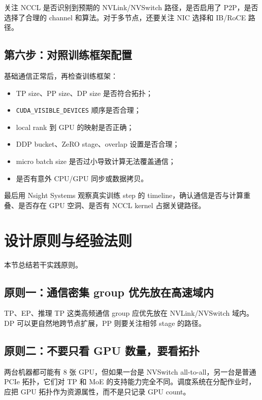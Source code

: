 关注 NCCL 是否识别到预期的 NVLink/NVSwitch 路径，是否启用了 P2P，是否选择了合理的 channel 和算法。对于多节点，还要关注 NIC 选择和 IB/RoCE 路径。

\subsection{第六步：对照训练框架配置}
\label{subsec:debug-step-framework}

基础通信正常后，再检查训练框架：

\begin{itemize}
  \item TP size、PP size、DP size 是否符合拓扑；
  \item \texttt{CUDA\_VISIBLE\_DEVICES} 顺序是否合理；
  \item local rank 到 GPU 的映射是否正确；
  \item DDP bucket、ZeRO stage、overlap 设置是否合理；
  \item micro batch size 是否过小导致计算无法覆盖通信；
  \item 是否有意外 CPU/GPU 同步或数据拷贝。
\end{itemize}

最后用 Nsight Systems 观察真实训练 step 的 timeline，确认通信是否与计算重叠、是否存在 GPU 空洞、是否有 NCCL kernel 占据关键路径。

\section{设计原则与经验法则}
\label{sec:nvlink-design-principles}

本节总结若干实践原则。

\subsection{原则一：通信密集 group 优先放在高速域内}
\label{subsec:principle-fast-domain}

TP、EP、推理 TP 这类高频通信 group 应优先放在 NVLink/NVSwitch 域内。DP 可以更自然地跨节点扩展，PP 则要关注相邻 stage 的路径。

\subsection{原则二：不要只看 GPU 数量，要看拓扑}
\label{subsec:principle-not-just-gpu-count}

两台机器都可能有 8 张 GPU，但如果一台是 NVSwitch all-to-all，另一台是普通 PCIe 拓扑，它们对 TP 和 MoE 的支持能力完全不同。调度系统在分配作业时，应把 GPU 拓扑作为资源属性，而不是只记录 GPU count。


